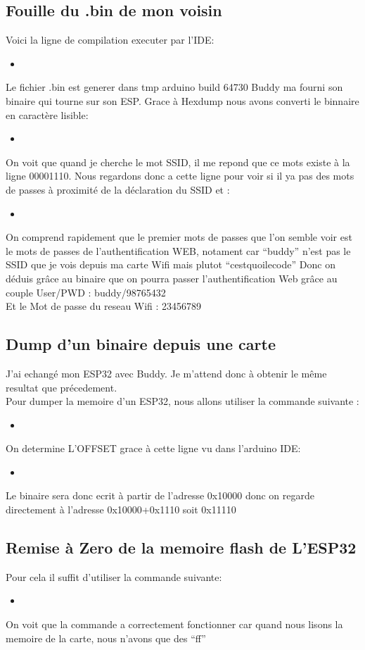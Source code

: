 \documentclass[10pt,a4paper]{article}
\newcommand{\insertcode}[2]{\begin{itemize}\item[]\end{itemize}}
\begin{document}
\subsection{Fouille du .bin de mon voisin}
Voici la ligne de compilation executer par l'IDE: \\
\insertcode{code/compil.txt}{compilation}

Le fichier .bin est generer dans  tmp arduino build 64730
Buddy ma fourni son binaire qui tourne sur son ESP. Grace à Hexdump nous avons converti le binnaire en caractère lisible:
\insertcode{code/hexcom.txt}{traduction}

 On voit que quand je cherche le mot SSID, il me repond que ce mots existe à la ligne 00001110. Nous regardons donc a cette ligne pour voir si il ya pas des mots de passes à proximité de la déclaration du SSID et :
 \insertcode{code/result.hex}{On a trouvé !}
 On comprend rapidement que le premier mots de passes que l'on semble voir est le mots de passes de l'authentification WEB, notament car ``buddy'' n'est pas le SSID que je vois depuis ma carte Wifi mais plutot ``cestquoilecode''
 Donc on déduis grâce au binaire que on pourra passer l'authentification Web grâce au couple User/PWD : buddy/98765432\\
 Et le Mot de passe du reseau Wifi : 23456789
 
 \subsection{Dump d'un binaire depuis une carte}
 J'ai echangé mon ESP32 avec Buddy. Je m'attend donc à obtenir le même resultat que précedement.\\
 Pour dumper la memoire d'un ESP32, nous allons utiliser la commande suivante :
 \insertcode{code/dump.txt}{Dump de la memoire flash d'un ESP}
 On determine L'OFFSET  grace à cette ligne vu dans l'arduino IDE:
 \insertcode{code/onsaitladdresse.txt}{Compilation}
 Le binaire sera donc ecrit à partir de l'adresse 0x10000 donc on regarde directement à l'adresse 0x10000+0x1110 soit 0x11110 

 \subsection{Remise à Zero de la memoire flash de L'ESP32}
 Pour cela il suffit d'utiliser la commande suivante:
 \insertcode{code/erase.txt}{esptool.py erase flash}
 On voit que la commande a correctement fonctionner car quand nous lisons la memoire de la carte, nous n'avons que des ``ff''
 
\end{document}
